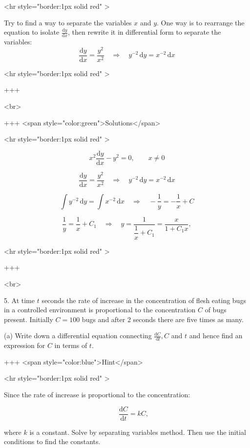 <hr style="border:1px solid red" >

Try to find a way to separate the variables $x$ and $y$. One way is to rearrange the equation to isolate $\frac{\mathrm{d}y}{\mathrm{d}x}$, then rewrite it in differential form to separate the variables:
$$
\frac{\mathrm{d}y}{\mathrm{d}x}=\frac{y^{2}}{x^{2}}
\quad\Longrightarrow\quad y^{-2}\,\mathrm{d}y=x^{-2}\,\mathrm{d}x
$$

<hr style="border:1px solid red" >

+++

<br>

+++ <span style="color:green">Solutions</span>

<hr style="border:1px solid red" >

$$
x^{2}\frac{\mathrm{d}y}{\mathrm{d}x}-y^{2}=0,\qquad x\neq0
$$



$$
\frac{\mathrm{d}y}{\mathrm{d}x}=\frac{y^{2}}{x^{2}}
\quad\Longrightarrow\quad
y^{-2}\,\mathrm{d}y=x^{-2}\,\mathrm{d}x
$$



$$
\int y^{-2}\,\mathrm{d}y=\int x^{-2}\,\mathrm{d}x
\quad\Rightarrow\quad
-\frac{1}{y}=-\frac{1}{x}+C
$$



$$
\frac{1}{y}=\frac{1}{x}+C_1
\quad\Rightarrow\quad
y=\frac{1}{\dfrac{1}{x}+C_1}=\frac{x}{1+C_1 x},
$$

<hr style="border:1px solid red" >

+++

<br>

5. At time $t$ seconds the rate of increase in the concentration of flesh eating bugs in a controlled environment is proportional to the concentration $C$ of bugs present. Initially $C=100$ bugs and after 2 seconds there are five times as many.

(a) Write down a differential equation connecting $\frac{\mathrm{d} C}{\mathrm{~d} t}, C$ and $t$ and hence find an expression for $C$ in terms of $t$.


+++ <span style="color:blue">Hint</span>

<hr style="border:1px solid red" >

Since the rate of increase is proportional to the concentration:

$$
\qquad \frac{\mathrm{d}C}{\mathrm{d}t}=kC,
$$

where $k$ is a constant. Solve by separating variables method. Then use the initial conditions to find the constants.


